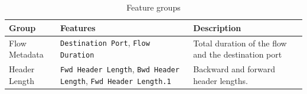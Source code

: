 \begin{longtable}{|p{4cm}|p{6cm}|p{6cm}|}
    \caption{Feature groups} \label{tab:features}                                                                                                                                                                                                                                                                                                                                                                                                                                                                                                                                             \\
    \hline
    \rowcolor[gray]{0.8} \textbf{Group}                                                                                                                                                                                                                                                                    & \textbf{Features}                                                                                                                                                                              & \textbf{Description}                                                            \\
    \hline
    \endfirsthead
    Flow Metadata                                                                                                                                                                                                                                                                                          &
    \texttt{Destination Port}, \texttt{Flow Duration}                                                                                                                                                                                                                                                      & Total duration of the flow and the destination port                                                                                                                                                                                                                              \\
    \hline
    Header Length                                                                                                                                                                                                                                                                                          &
    \texttt{Fwd Header Length}, \texttt{Bwd Header Length}, \texttt{Fwd Header Length.1}                                                                                                                                                                                                                   & Backward and forward header lengths.                                                                                                                                                                                                                                             \\

\end{longtable}
